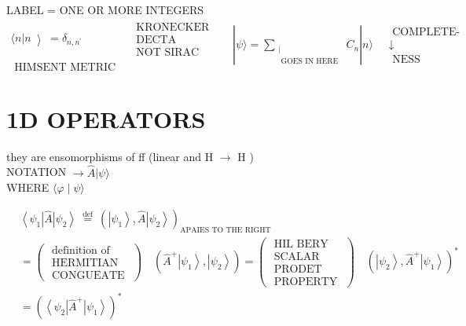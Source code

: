 \documentclass[10pt]{article}
\begin{document}
LABEL = ONE OR MORE INTEGERS\\
$\begin{array}{cc}\langle n| n\left\rangle=\delta_{n, n^{\prime}}\right. & \begin{array}{c}\text { KRONECKER } \\ \text { DECTA } \\ \text { NOT SIRAC }\end{array} \\ \text { HIMSENT METRIC } & \end{array} \quad|\psi\rangle=\sum_{\substack{\mid \\ \text { GOES IN HERE }}} C_{n}|n\rangle \quad \begin{gathered}\text { COMPLETE- } \\ \downarrow \\ \text { NESS }\end{gathered}$

\section*{1D OPERATORS}
they are ensomorphisms of ff (linear and H $\rightarrow$ H )\\
NOTATION $\rightarrow \hat{A}|\psi\rangle$\\
WHERE $\langle\varphi \mid \psi\rangle$

$$
\begin{aligned}
& \left\langle\psi_{1}\right| \hat{A}\left|\psi_{2}\right\rangle \stackrel{\text { def }}{=}\left(\left|\psi_{1}\right\rangle, \hat{A}\left|\psi_{2}\right\rangle\right)_{\text {APAIES TO THE RIGHT }} \\
& =\left(\begin{array}{l}
\text { definition of } \\
\text { HERMITIAN } \\
\text { CONGUEATE }
\end{array}\right) \quad\left(\hat{A}^{+}\left|\psi_{1}\right\rangle,\left|\psi_{2}\right\rangle\right)=\left(\begin{array}{c}
\text { HIL BERY } \\
\text { SCALAR } \\
\text { PRODET } \\
\text { PROPERTY }
\end{array}\right) \quad\left(\left|\psi_{2}\right\rangle, \hat{A}^{+}\left|\psi_{1}\right\rangle\right)^{*} \\
& =\left(\left\langle\psi_{2}\right| \hat{A}^{+}\left|\psi_{1}\right\rangle\right)^{*}
\end{aligned}
$$
\end{document}
